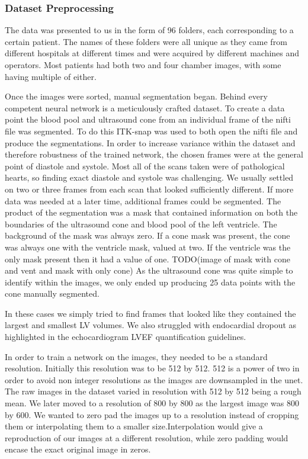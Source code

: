 \documentclass[12pt]{article}
\begin{document}
\subsubsection{Dataset Preprocessing}
The data was presented to us in the form of 96 folders, each corresponding to a certain patient.
The names of these folders were all unique as they came from different hospitals at different times and were acquired by different machines and operators.
Most patients had both two and four chamber images, with some having multiple of either. 

Once the images were sorted, manual segmentation began. Behind every competent neural network is a meticulously crafted dataset.
To create a data point the blood pool and ultrasound cone from an individual frame of the nifti file was segmented. To do this ITK-snap was used to both open the nifti file and produce the segmentations.
In order to increase variance within the dataset and therefore robustness of the trained network, the chosen frames were at the general point of diastole and systole.
Most all of the scans taken were of pathological hearts, so finding exact diastole and systole was challenging.
We usually settled on two or three frames from each scan that looked sufficiently different.
If more data was needed at a later time, additional frames could be segmented.
The product of the segmentation was a mask that contained information on both the boundaries of the ultrasound cone and blood pool of the left ventricle.
The background of the mask was always zero. If a cone mask was present, the cone was always one with the ventricle mask, valued at two.
If the ventricle was the only mask present then it had a value of one.
TODO(image of mask with cone and vent and mask with only cone)
As the ultrasound cone was quite simple to identify within the images, we only ended up producing 25 data points with the cone manually segmented.
\par
In these cases we simply tried to find frames that looked like they contained the largest and smallest LV volumes.
We also struggled with endocardial dropout as highlighted in the echocardiogram LVEF quantification guidelines.
\par
In order to train a network on the images, they needed to be a standard resolution.
Initially this resolution was to be 512 by 512. 512 is a power of two in order to avoid non integer resolutions as the images are downsampled in the unet.
The raw images in the dataset varied in resolution with 512 by 512 being a rough mean.
We later moved to a resolution of 800 by 800 as the largest image was 800 by 600. We wanted to zero pad the images up to a resolution instead of cropping them or interpolating them to a smaller size.Interpolation would give a reproduction of our images at a different resolution, while zero padding would encase the exact original image in zeros.
\end{document}
